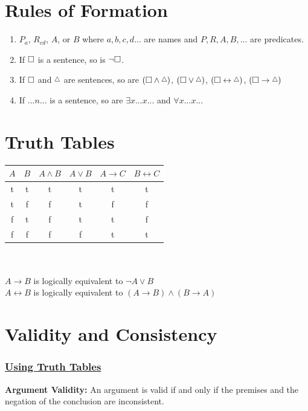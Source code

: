 \documentclass[12pt]{article}
\def\s{\mathord{\scalerel*{\square}{X}}}
\def\t{\mathord{\scalerel*{\triangle}{X}}}
\begin{document}
\section*{Rules of Formation}
\begin{enumerate}[start=0]
  \item $P_a$, $R_{cd}$, $A$, or $B$ where ${a,b,c,d...}$ are names and ${P,R,A,B,...}$ are predicates.
  \item If $\s$ is a sentence, so is $\neg\s$.
  \item If $\s$ and $\t$ are sentences, so are $(\s \land \t)$, $(\s \lor \t)$, $(\s \leftrightarrow \t)$, $(\s \rightarrow \t)$
  \item If $...n...$ is a sentence, so are $\exists x ... x ...$ and $\forall x ... x ...$  
\end{enumerate}

\section*{Truth Tables}
\begin{tabular}{cc|cccc}
  $A$ & $B$ & $A \land B$ & $A \lor B$ & $A \rightarrow C$ & $B \leftrightarrow C$ \\ \hline
  t & t & t & t & t & t \\
  t & f & f & t & f & f \\
  f & t & f & t & t & f \\
  f & f & f & f & t & t
\end{tabular}
\\ \\
$A \rightarrow B$ is logically equivalent to $\neg A \lor B$ \\
$A \leftrightarrow B$ is logically equivalent to $(A \rightarrow B) \land (B \rightarrow A)$

\section*{Validity and Consistency}
\subsubsection*{\underline{Using Truth Tables}}
\textbf{Argument Validity:} An  argument  is  valid  if  and  only  if  the  premises  and  the  negation  of  the conclusion are inconsistent.
\end{document}

